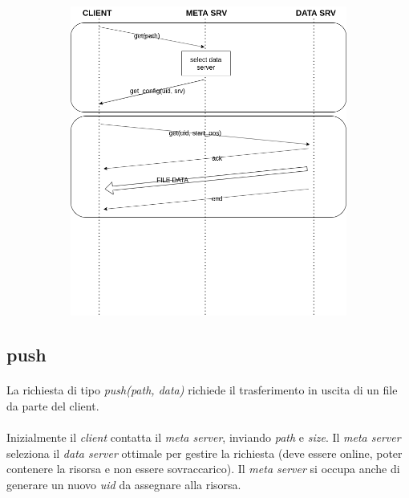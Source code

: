 \documentclass{article}
\begin{document}
\begin{figure}[H]
	\centering
	\begin{subfigure}{0.80\linewidth}
		\includegraphics[width=\linewidth]{../diagrams/requests/get_request.png}
	\end{subfigure}
\end{figure}


\subsection{push}

\paragraph{} La richiesta di tipo \emph{push(path, data)} richiede il trasferimento in uscita di un file da parte del client. 

\paragraph{} Inizialmente il \emph{client} contatta il \emph{meta server}, inviando \emph{path} e \emph{size}. Il \emph{meta server} seleziona il \emph{data server} ottimale per gestire la richiesta (deve essere online, poter contenere la risorsa e non essere sovraccarico). Il \emph{meta server} si occupa anche di generare un nuovo \emph{uid} da assegnare alla risorsa. 
\end{document}
